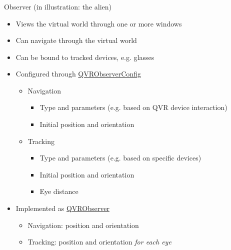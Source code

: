 \documentclass[utf8,stillsansserifmath,fleqn,t]{beamer}
\begin{document}
\begin{frame}
\frametitle{\insertsection}
Observer (in illustration: the alien)
\begin{itemize}
\item Views the virtual world through one or more windows
\item Can navigate through the virtual world
\item Can be bound to tracked devices, e.g. glasses
\item Configured through \href{https://marlam.de/qvr/libqvr-reference/class_q_v_r_observer_config.html}{QVRObserverConfig}
    \begin{itemize}
    \item Navigation
        \begin{itemize}
        \item Type and parameters (e.g. based on QVR device interaction)
        \item Initial position and orientation
        \end{itemize}
    \item Tracking
        \begin{itemize}
        \item Type and parameters (e.g. based on specific devices)
        \item Initial position and orientation
        \item Eye distance
        \end{itemize}
    \end{itemize}
\item Implemented as \href{https://marlam.de/qvr/libqvr-reference/class_q_v_r_observer.html}{QVRObserver}
    \begin{itemize}
    \item Navigation: position and orientation
    \item Tracking: position and orientation \emph{for each eye}
    \end{itemize}
\end{itemize}
\end{frame}
\end{document}
